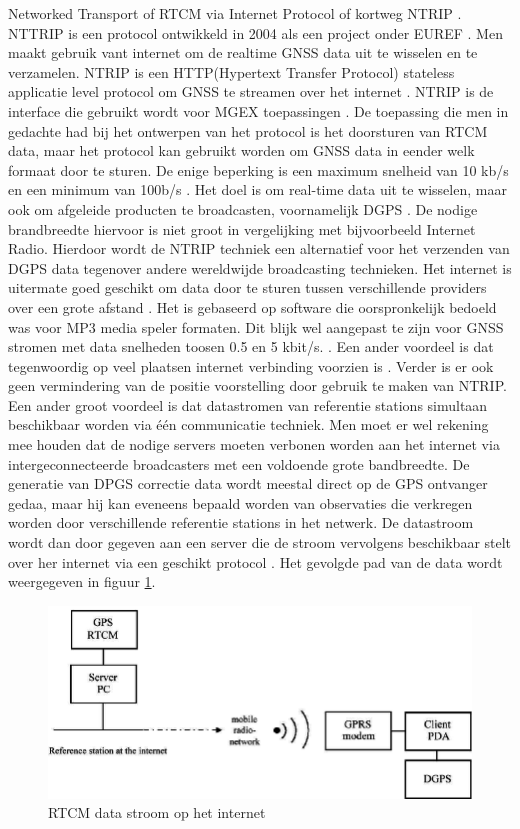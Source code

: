Networked Transport of RTCM via Internet Protocol of kortweg NTRIP \cite{LBibNTRIP,LBibNTRIP3}. NTTRIP is een protocol ontwikkeld in 2004 \cite{LBibNTRIP3} als een project onder EUREF \cite{LBibNTRIP4}. Men maakt gebruik vant internet om de realtime GNSS data uit te wisselen en te verzamelen. NTRIP is een HTTP(Hypertext Transfer Protocol) stateless applicatie level protocol om GNSS te streamen over het internet \cite{LBibNTRIP}. NTRIP is de interface die gebruikt wordt voor MGEX toepassingen \cite{LBibGNSS9}. De toepassing die men in gedachte had bij het ontwerpen van het protocol is het doorsturen van RTCM data, maar het protocol kan gebruikt worden om GNSS data in eender welk formaat door te sturen. De enige beperking is een maximum snelheid van 10 kb/s en een minimum van 100b/s \cite{LBibNTRIP3}.  Het doel is om real-time data uit te wisselen, maar ook om afgeleide producten te broadcasten, voornamelijk DGPS \cite{LBibNTRIP2}. De nodige brandbreedte hiervoor is niet groot in vergelijking met bijvoorbeeld Internet Radio\cite{LBibNTRIP}. Hierdoor wordt de NTRIP techniek een alternatief voor het verzenden van DGPS data tegenover andere  wereldwijde broadcasting technieken. Het internet is uitermate goed geschikt om data door te sturen tussen verschillende providers over een grote afstand \cite{LBibNTRIP2}. Het is gebaseerd op software die oorspronkelijk bedoeld was voor MP3 media speler formaten. Dit blijk wel aangepast te zijn voor GNSS stromen met data snelheden toosen 0.5 en 5 kbit/s. \cite{LBibGPS}. Een ander voordeel is dat tegenwoordig op veel plaatsen internet verbinding voorzien is \cite{LBibNTRIP}. Verder is er ook geen vermindering van de positie voorstelling door gebruik te maken van NTRIP. Een ander groot voordeel is dat datastromen van referentie stations simultaan beschikbaar worden via \'e\'en communicatie techniek. Men moet er wel rekening mee houden dat de nodige servers moeten verbonen worden aan het internet via intergeconnecteerde broadcasters met een voldoende grote bandbreedte.  De generatie van DPGS correctie data wordt meestal direct op de GPS ontvanger gedaa, maar hij kan eveneens bepaald worden van observaties die verkregen worden door verschillende referentie stations in het netwerk. De datastroom wordt dan door gegeven aan een server die de stroom vervolgens beschikbaar stelt over her internet via een geschikt protocol \cite{LBibNTRIP2}. Het gevolgde pad van de data wordt weergegeven in figuur \ref{imgNTRIP2}.
\begin{figure}[hpb]
	\includegraphics[scale=0.4]{NTRIP2.png}
	\caption{RTCM data stroom op het internet \cite{LBibNTRIP2}}
	\label{imgNTRIP2}
\end{figure} 

